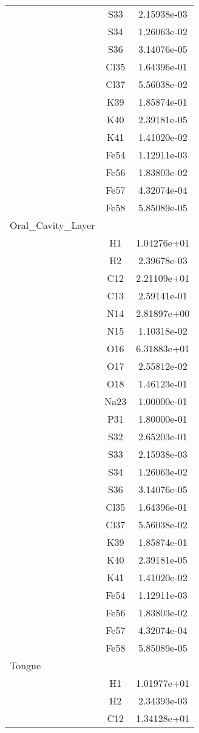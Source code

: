 \begin{centering}
\begin{longtable}{l c c}
& S33 & 2.15938e-03 \\ 
& S34 & 1.26063e-02 \\ 
& S36 & 3.14076e-05 \\ 
& Cl35 & 1.64396e-01 \\ 
& Cl37 & 5.56038e-02 \\ 
& K39 & 1.85874e-01 \\ 
& K40 & 2.39181e-05 \\ 
& K41 & 1.41020e-02 \\ 
& Fe54 & 1.12911e-03 \\ 
& Fe56 & 1.83803e-02 \\ 
& Fe57 & 4.32074e-04 \\ 
& Fe58 & 5.85089e-05 \\ 
\hline
Oral_Cavity_Layer & & \\
\hline
& H1 & 1.04276e+01 \\ 
& H2 & 2.39678e-03 \\ 
& C12 & 2.21109e+01 \\ 
& C13 & 2.59141e-01 \\ 
& N14 & 2.81897e+00 \\ 
& N15 & 1.10318e-02 \\ 
& O16 & 6.31883e+01 \\ 
& O17 & 2.55812e-02 \\ 
& O18 & 1.46123e-01 \\ 
& Na23 & 1.00000e-01 \\ 
& P31 & 1.80000e-01 \\ 
& S32 & 2.65203e-01 \\ 
& S33 & 2.15938e-03 \\ 
& S34 & 1.26063e-02 \\ 
& S36 & 3.14076e-05 \\ 
& Cl35 & 1.64396e-01 \\ 
& Cl37 & 5.56038e-02 \\ 
& K39 & 1.85874e-01 \\ 
& K40 & 2.39181e-05 \\ 
& K41 & 1.41020e-02 \\ 
& Fe54 & 1.12911e-03 \\ 
& Fe56 & 1.83803e-02 \\ 
& Fe57 & 4.32074e-04 \\ 
& Fe58 & 5.85089e-05 \\ 
\hline
Tongue & & \\
\hline
& H1 & 1.01977e+01 \\ 
& H2 & 2.34393e-03 \\ 
& C12 & 1.34128e+01 \\ 

\end{longtable}
\end{centering}
